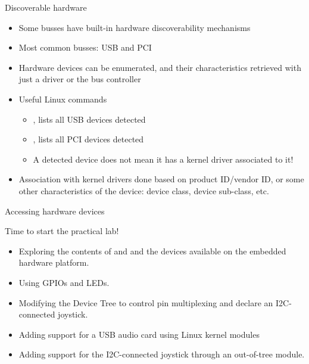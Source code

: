 \begin{frame}{Discoverable hardware}
  \begin{itemize}
  \item Some busses have built-in hardware discoverability mechanisms
  \item Most common busses: USB and PCI
  \item Hardware devices can be enumerated, and their characteristics
    retrieved with just a driver or the bus controller
  \item Useful Linux commands
    \begin{itemize}
    \item {}, lists all USB devices detected
    \item {}, lists all PCI devices detected
    \item A detected device does not mean it has a kernel driver
      associated to it!
    \end{itemize}
  \item Association with kernel drivers done based on product
    ID/vendor ID, or some other characteristics of the device: device
    class, device sub-class, etc.
  \end{itemize}
\end{frame}

\setuplabframe
{Accessing hardware devices}
{
  Time to start the practical lab!
  \begin{itemize}
  \item Exploring the contents of  and  and the
    devices available on the embedded hardware platform.
  \item Using GPIOs and LEDs.
  \item Modifying the Device Tree to control pin multiplexing and
        declare an I2C-connected joystick.
  \item Adding support for a USB audio card using Linux kernel modules
  \item Adding support for the I2C-connected joystick through
        an out-of-tree module.
  \end{itemize}
}
